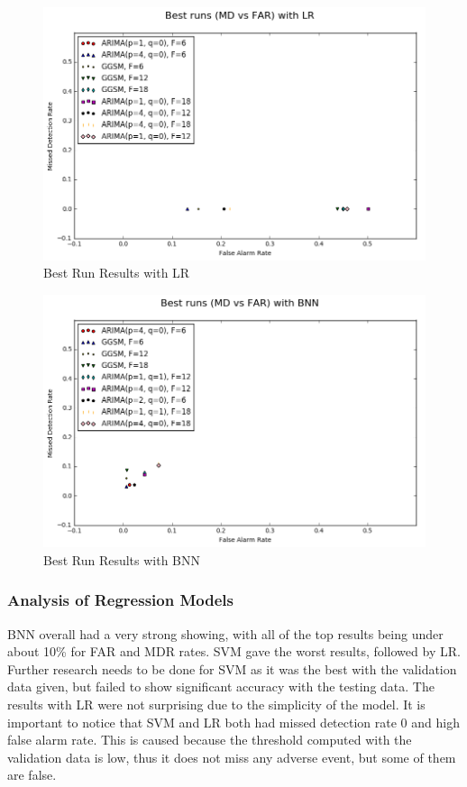 \documentclass{acm_proc_article-sp}
\begin{document}
\begin{figure}[!h]
\centering
    \includegraphics[scale=0.4]{figures/best_runs_lr.png}
\caption{Best Run Results with LR} 
\label{fig:lrbest}
\end{figure}



\begin{figure}[!h]
\centering
    \includegraphics[scale=0.4]{figures/best_runs_bnn.png}
\caption{Best Run Results with BNN} 
\label{fig:bnnbest}
\end{figure}



\vspace{.2in}
\subsubsection{Analysis of Regression Models}
BNN overall had a very strong showing, with all of the top results being under about 10\% for FAR and MDR rates. SVM gave the worst results, followed by LR. Further research needs to be done for SVM as it was the best with the validation data given, but failed to show significant accuracy with the testing data. The results with LR were not surprising due to the simplicity of the model. It is important to notice that SVM and LR both had missed detection rate 0 and high false alarm rate. This is caused because the threshold computed with the validation data is low, thus it does not miss any adverse event, but some of them are false. 
\end{document}
